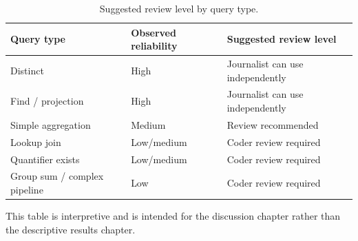 \begin{table}[htbp]
\centering
\small
\caption{Suggested review level by query type.}
\label{tab:review-requirement-guidance}
\begin{tabular}{lll}
\toprule
Query type & Observed reliability & Suggested review level \\
\midrule
Distinct & High & Journalist can use independently \\
Find / projection & High & Journalist can use independently \\
Simple aggregation & Medium & Review recommended \\
Lookup join & Low/medium & Coder review required \\
Quantifier exists & Low/medium & Coder review required \\
Group sum / complex pipeline & Low & Coder review required \\
\bottomrule
\end{tabular}
\par\footnotesize{This table is interpretive and is intended for the discussion chapter rather than the descriptive results chapter.}
\end{table}
